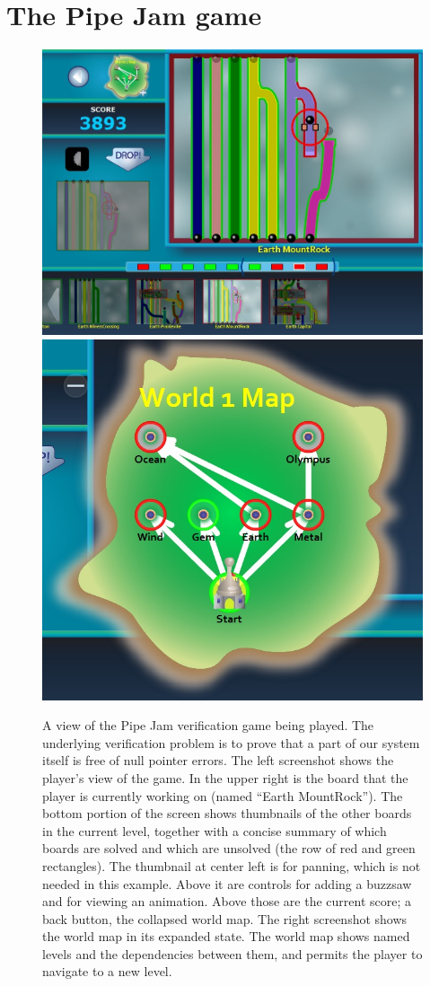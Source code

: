 \documentclass{sig-alternate}
\begin{document}
\section{The Pipe Jam game}
\label{sec:pipejam}


\begin{figure}
\begin{center}
\includegraphics[width=.49\textwidth]{images/allUI-world1}%
\hspace{10mm}
\includegraphics[width=.35\textwidth]{images/world-map}%
\end{center}

\caption{
  A view of the Pipe Jam verification game being played.  The underlying
  verification problem is to prove that a part of our system itself is free of
  null pointer errors.
  \newline
  The left screenshot shows the player's view of the game.  In the
  upper right is the board that the player is currently working on
  (named ``Earth MountRock'').  The bottom portion of the screen shows
  thumbnails of the other boards in the current level, together
  with a concise summary of which boards are solved and which are
  unsolved (the row of red and green rectangles).  The thumbnail at
  center left is for panning, which is not needed in this example.
  Above it are controls for adding a buzzsaw and for viewing an
  animation.  Above those are the current score; a back button, the collapsed
  world map.
  \newline
  The right screenshot shows the world map in its expanded state.  The
  world map shows named levels and the dependencies between them, and 
  permits the player to navigate to a new level.
}
\label{fig:game-overview}
\end{figure}
\end{document}
